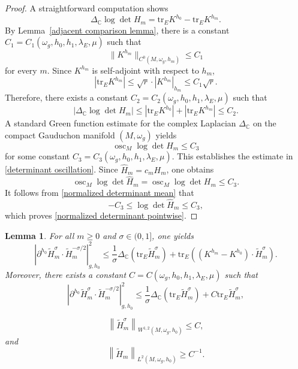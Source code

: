 \documentclass[12pt, reqno]{amsart}
\theoremstyle{plain}
\newtheorem{lemma}[thm]{Lemma}
\theoremstyle{definition}
\newcommand{\blemma}{\begin{lemma}}
\newcommand{\elemma}{\end{lemma}}
\newcommand{\p}{\partial}
\newcommand{\beq}{\begin{equation}}
\newcommand{\eeq}{\end{equation}}
\renewcommand{\hat}{\widehat}
\renewcommand{\tilde}{\widetilde}
\renewcommand{\>}{\rightarrow}
\newcommand{\C}{{\mathbb C}}
\newcommand{\om}{\omega}
\newcommand{\tr}{\mathrm{tr}}
\numberwithin{equation}{section}
\begin{document}
\begin{proof}
	A straightforward computation  shows
	\beq
	\Delta_{\C}\log\det H_m
	=\tr_EK^{h_0}-\tr_EK^{h_m}.
	\eeq
	By Lemma~\ref{adjacent comparison lemma},  there is a
	constant $C_1=C_1(\omega_g, h_0,h_1,\lambda_E,\mu)$ such that
	\beq
	\|K^{h_m}\|_{C^0(M,\om_g,h_m)}\leq C_1
	\eeq
	for every $m$.  Since $K^{h_m}$ is self-adjoint with respect to $h_m$,
	\beq
	\left|\tr_EK^{h_m}\right|
	\leq\sqrt r\cdot|K^{h_m}|_{h_m}
	\leq C_1\sqrt r.
	\eeq
	Therefore, there exists a constant $C_2=C_2(\om_g,h_0,h_1,\lambda_E,\mu)$ such that 
	\beq
	\left|\Delta_{\C}\log\det H_m\right|\leq \left|\tr_EK^{h_0}\right|+\left|\tr_E K^{h_m}\right|\leq C_2.
	\eeq 
	A standard Green function estimate for the complex Laplacian $\Delta_\C$ on the compact Gauduchon manifold $(M,\omega_g)$ yields 
	\beq
	\operatorname{osc}_M \log\det H_m \leq C_3
	\eeq 
	for some constant $C_3=C_3(\om_g,h_0,h_1,\lambda_E,\mu)$. This establishes the estimate in \eqref{determinant oscillation}.  Since $\hat H_m = c_m H_m$,  one obtains
	\beq 
	\operatorname{osc}_M \log\det \hat H_m=
	\operatorname{osc}_M \log\det H_m \leq C_3.
	\eeq 
	It follows from  \eqref{normalized determinant mean} that 
	\beq
	-C_3\leq \log\det \hat H_m\leq C_3,
	\eeq
	which proves \eqref{normalized determinant pointwise}.
\end{proof}


\blemma\label{lem priori estimates for weak compactness}
For all
$m\geq0$ and $\sigma\in(0,1]$, one yields
\beq
\left| \p^{h_0}\tilde H_m^\sigma \cdot \tilde H_m^{-\sigma/2} \right|_{g,h_0}^2
\leq  \frac{1}{\sigma}\Delta_\C\left(\tr_E \tilde H_m^\sigma\right)
+\tr_E\left(\left(K^{h_m}-K^{h_0}\right)\cdot \tilde H_m^\sigma\right). \label{estimateA}
\eeq
Moreover, there exists a constant $C=C(\omega_g, h_0,h_1,\lambda_E,\mu)$ such that 
\beq
\left|\p^{h_0}\tilde H_m^\sigma\cdot\tilde H_m^{-\sigma/2}\right|_{g,h_0}^2
\leq\frac{1}{\sigma}\Delta_\C\left(\tr_E\tilde H_m^\sigma\right)
+C\tr_E\tilde H_m^\sigma,
\label{tilde H inequality}
\eeq

\beq
\left\|\tilde H_m^\sigma\right\|_{W^{1,2}(M,\omega_g,h_0)}\leq C, 
\label{tilde H W2p estimate}
\eeq
and
\beq
\left\|\tilde H_m\right\|_{L^2(M,\omega_g,h_0)}\geq C^{-1}.
\label{non-trivial condition}
\eeq
\elemma
\end{document}
